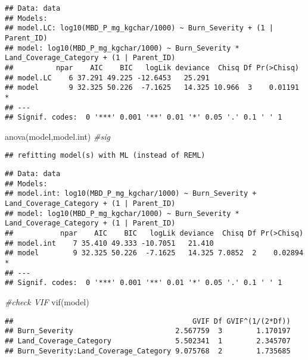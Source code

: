 \documentclass[
]{article}
\newenvironment{Shaded}{\begin{snugshade}}{\end{snugshade}}
\newcommand{\CommentTok}[1]{\textcolor[rgb]{0.56,0.35,0.01}{\textit{#1}}}
\newcommand{\FunctionTok}[1]{\textcolor[rgb]{0.00,0.00,0.00}{#1}}
\newcommand{\NormalTok}[1]{#1}
\begin{document}
\begin{verbatim}
## Data: data
## Models:
## model.LC: log10(MBD_P_mg_kgchar/1000) ~ Burn_Severity + (1 | Parent_ID)
## model: log10(MBD_P_mg_kgchar/1000) ~ Burn_Severity * Land_Coverage_Category + (1 | Parent_ID)
##          npar    AIC    BIC   logLik deviance  Chisq Df Pr(>Chisq)  
## model.LC    6 37.291 49.225 -12.6453   25.291                       
## model       9 32.325 50.226  -7.1625   14.325 10.966  3    0.01191 *
## ---
## Signif. codes:  0 '***' 0.001 '**' 0.01 '*' 0.05 '.' 0.1 ' ' 1
\end{verbatim}

\begin{Shaded}
\begin{Highlighting}[]
\FunctionTok{anova}\NormalTok{(model,model.int) }\CommentTok{\#sig}
\end{Highlighting}
\end{Shaded}

\begin{verbatim}
## refitting model(s) with ML (instead of REML)
\end{verbatim}

\begin{verbatim}
## Data: data
## Models:
## model.int: log10(MBD_P_mg_kgchar/1000) ~ Burn_Severity + Land_Coverage_Category + (1 | Parent_ID)
## model: log10(MBD_P_mg_kgchar/1000) ~ Burn_Severity * Land_Coverage_Category + (1 | Parent_ID)
##           npar    AIC    BIC   logLik deviance  Chisq Df Pr(>Chisq)  
## model.int    7 35.410 49.333 -10.7051   21.410                       
## model        9 32.325 50.226  -7.1625   14.325 7.0852  2    0.02894 *
## ---
## Signif. codes:  0 '***' 0.001 '**' 0.01 '*' 0.05 '.' 0.1 ' ' 1
\end{verbatim}

\begin{Shaded}
\begin{Highlighting}[]
\CommentTok{\#check VIF}
\FunctionTok{vif}\NormalTok{(model)}
\end{Highlighting}
\end{Shaded}

\begin{verbatim}
##                                          GVIF Df GVIF^(1/(2*Df))
## Burn_Severity                        2.567759  3        1.170197
## Land_Coverage_Category               5.502341  1        2.345707
## Burn_Severity:Land_Coverage_Category 9.075768  2        1.735685
\end{verbatim}
\end{document}
